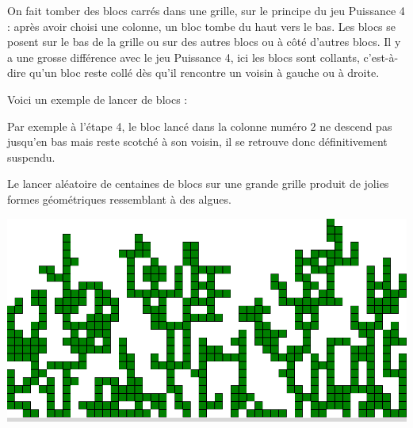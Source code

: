 \documentclass[11pt,class=report,crop=false]{standalone}
\begin{document}
\begin{cours}
On fait tomber des blocs carrés dans une grille, sur le principe du jeu \og{}Puissance 4\fg{} : après avoir choisi une colonne, un bloc tombe du haut vers le bas. Les blocs se posent sur le bas de la grille ou sur des autres blocs ou à côté d'autres blocs. Il y a une grosse différence avec le jeu \og{}Puissance 4\fg{}, ici les blocs sont \og{}collants\fg{}, c'est-à-dire qu'un bloc reste collé dès qu'il rencontre un voisin à gauche ou à droite.


Voici un exemple de lancer de blocs :

Par exemple à l'étape 4, le bloc lancé dans la colonne numéro $2$ ne descend pas jusqu'en bas mais reste \og{}scotché\fg{} à son voisin, il se retrouve donc définitivement suspendu.

Le lancer aléatoire de centaines de blocs sur une grande grille produit de jolies formes géométriques ressemblant à des algues.

\begin{center}
\includegraphics[scale=0.3]{ecran-alea-bloc0}
\end{center}

\end{cours}



\end{document}

